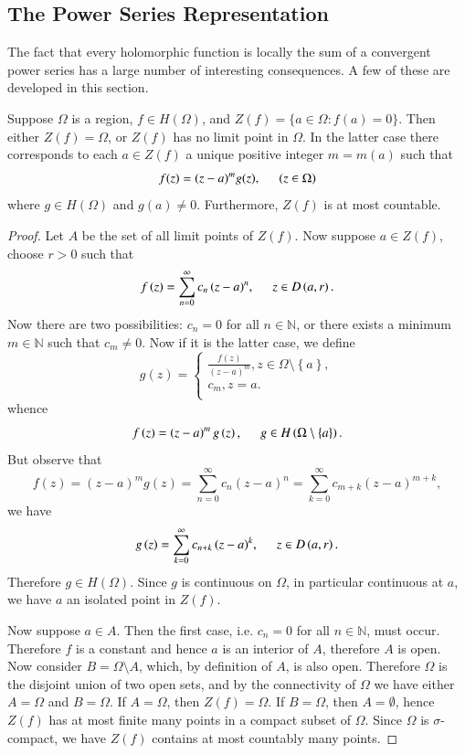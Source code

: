 \subsection{The Power Series Representation}
The fact that every holomorphic function is locally the sum of a convergent power series has a large number of interesting consequences. A few of these are developed in this section.
\begin{theorem}
Suppose $\Omega$ is a region, $f\in H(\Omega)$, and $Z(f)=\{a\in\Omega:f(a)=0\}$. Then either $Z(f)=\Omega$, or $Z(f)$ has no limit point in $\Omega$. In the latter case there corresponds to each $a\in Z(f)$ a unique positive integer $m=m(a)$ such that 
$$f(z)=(z-a)^mg(z),\hspace{0.5cm}(z\in\Omega)$$
where $g\in H(\Omega)$ and $g(a)\ne 0$. Furthermore, $Z(f)$ is at most countable.
\end{theorem}
\begin{proof}
Let $A$ be the set of all limit points of $Z(f)$. Now suppose $a\in Z(f)$, choose $r>0$ such that 
$$
f\left( z \right) =\sum_{n=0}^{\infty}{c_n\left( z-a \right) ^n},\hspace{0.5cm}z\in D\left( a,r \right) .
$$
Now there are two possibilities: $c_n=0$ for all $n\in\mathbb{N}$, or there exists a minimum $m\in\mathbb{N}$ such that $c_m\ne 0$. Now if it is the latter case, we define 
$$
g\left( z \right) =\begin{cases}
	\frac{f\left( z \right)}{\left( z-a \right) ^m},z\in \Omega \setminus \left\{ a \right\} ,\\
	c_m,z=a.\\
\end{cases}
$$
whence 
$$
f\left( z \right) =\left( z-a \right) ^mg\left( z \right) ,\hspace{0.5cm}g\in H\left( \Omega \setminus \left\{ a \right\} \right) .
$$
But observe that 
$$
f\left( z \right) =\left( z-a \right) ^mg\left( z \right) =\sum_{n=0}^{\infty}{c_n\left( z-a \right) ^n}=\sum_{k=0}^{\infty}{c_{m+k}\left( z-a \right) ^{m+k}},
$$
we have 
$$
g\left( z \right) =\sum_{k=0}^{\infty}{c_{n+k}\left( z-a \right) ^k},\hspace{0.5cm}z\in D\left( a,r \right) .
$$
Therefore $g\in H(\Omega)$. Since $g$ is continuous on $\Omega$, in particular continuous at $a$, we have $a$ an isolated point in $Z(f)$.\par
Now suppose $a\in A$. Then the first case, i.e. $c_n=0$ for all $n\in\mathbb{N}$, must occur. Therefore $f$ is a constant and hence $a$ is an interior of $A$, therefore $A$ is open. Now consider $B=\Omega\setminus A$, which, by definition of $A$, is also open. Therefore $\Omega$ is the disjoint union of two open sets, and by the connectivity of $\Omega$ we have either $A=\Omega$ and $B=\Omega$. If $A=\Omega$, then $Z(f)=\Omega$. If $B=\Omega$, then $A=\emptyset$, hence $Z(f)$ has at most finite many points in a compact subset of $\Omega$. Since $\Omega$ is $\sigma$-compact, we have $Z(f)$ contains at most countably many points.
\end{proof}
